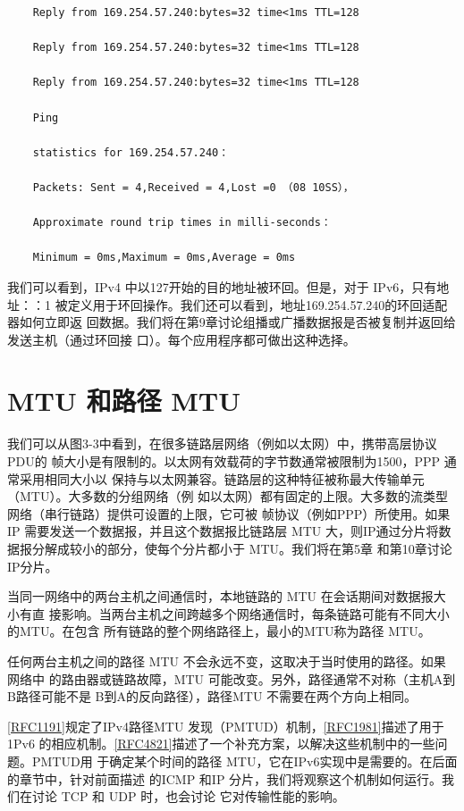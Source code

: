 \begin{verbatim}
    Reply from 169.254.57.240:bytes=32 time<1ms TTL=128
    
    Reply from 169.254.57.240:bytes=32 time<1ms TTL=128
    
    Reply from 169.254.57.240:bytes=32 time<1ms TTL=128
    
    Ping
    
    statistics for 169.254.57.240：
    
    Packets: Sent = 4,Received = 4,Lost =0 （08 10SS），
    
    Approximate round trip times in milli-seconds：
    
    Minimum = 0ms,Maximum = 0ms,Average = 0ms
\end{verbatim}

我们可以看到，IPv4 中以127开始的目的地址被环回。但是，对于 IPv6，只有地址：：1
被定义用于环回操作。我们还可以看到，地址169.254.57.240的环回适配器如何立即返
回数据。我们将在第9章讨论组播或广播数据报是否被复制并返回给发送主机（通过环回接
口）。每个应用程序都可做出这种选择。

\section{MTU 和路径 MTU}

我们可以从图3-3中看到，在很多链路层网络（例如以太网）中，携带高层协议 PDU的
帧大小是有限制的。以太网有效载荷的字节数通常被限制为1500，PPP 通常采用相同大小以
保持与以太网兼容。链路层的这种特征被称最大传输单元（MTU）。大多数的分组网络（例
如以太网）都有固定的上限。大多数的流类型网络（串行链路）提供可设置的上限，它可被
帧协议（例如PPP）所使用。如果IP 需要发送一个数据报，并且这个数据报比链路层 MTU
大，则IP通过分片将数据报分解成较小的部分，使每个分片都小于 MTU。我们将在第5章
和第10章讨论IP分片。

当同一网络中的两台主机之间通信时，本地链路的 MTU 在会话期间对数据报大小有直
接影响。当两台主机之间跨越多个网络通信时，每条链路可能有不同大小的MTU。在包含
所有链路的整个网络路径上，最小的MTU称为路径 MTU。

任何两台主机之间的路径 MTU 不会永远不变，这取决于当时使用的路径。如果网络中
的路由器或链路故障，MTU 可能改变。另外，路径通常不对称（主机A到B路径可能不是
B到A的反向路径），路径MTU 不需要在两个方向上相同。

\href{https://www.rfc-editor.org/rfc/rfc1191}{[RFC1191]}规定了IPv4路径MTU 发现（PMTUD）机制，\href{https://www.rfc-editor.org/rfc/rfc1981}{[RFC1981]}描述了用于1Pv6
的相应机制。\href{https://www.rfc-editor.org/rfc/rfc4821}{[RFC4821]}描述了一个补充方案，以解决这些机制中的一些问题。PMTUD用
于确定某个时间的路径 MTU，它在IPv6实现中是需要的。在后面的章节中，针对前面描述
的ICMP 和IP 分片，我们将观察这个机制如何运行。我们在讨论 TCP 和 UDP 时，也会讨论
它对传输性能的影响。


